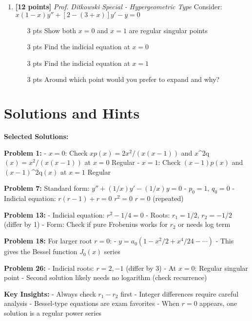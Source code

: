 \documentclass[12pt]{article}
\begin{document}
\begin{enumerate}[resume]
\item \textbf{[12 points]} \textit{Prof. Ditkowski Special - Hypergeometric Type}
Consider: $x(1-x)y'' + [2-(3+x)]y' - y = 0$
\begin{enumerate}[label=(\alph*)]
\item [3 pts] Show both $x = 0$ and $x = 1$ are regular singular points
\item [3 pts] Find the indicial equation at $x = 0$
\item [3 pts] Find the indicial equation at $x = 1$
\item [3 pts] Around which point would you prefer to expand and why?
\end{enumerate}
\end{enumerate}

\section*{Solutions and Hints}

\textbf{Selected Solutions:}

\textbf{Problem 1:}
- $x = 0$: Check $xp(x) = 2x^{2}/(x(x-1))$ and $x$^{2q}$(x) = x^{2}/(x(x-1))$ at $x = 0$ \rightarrow Regular
- $x = 1$: Check $(x-1)p(x)$ and $(x-1)$^{2q}$(x)$ at $x = 1$ \rightarrow Regular

\textbf{Problem 7:}
Standard form: $y'' + (1/x)y' - (1/x)y = 0$
- $p_{0} = 1$, $q_{0} = 0$
- Indicial equation: $r(r-1) + r = 0$ \rightarrow $r^{2} = 0$ \rightarrow $r = 0$ (repeated)

\textbf{Problem 13:}
- Indicial equation: $r^{2} - 1/4 = 0$
- Roots: $r_{1} = 1/2$, $r_{2} = -1/2$ (differ by 1)
- Form: Check if pure Frobenius works for $r_{2}$ or needs log term

\textbf{Problem 18:}
For larger root $r = 0$:
- $y = a_{0}(1 - x^{2}/2 + x^{4}/24 - \cdots)$
- This gives the Bessel function $J_{0}(x)$ series

\textbf{Problem 26:}
- Indicial roots: $r = 2, -1$ (differ by 3)
- At $x = 0$: Regular singular point
- Second solution likely needs no logarithm (check recurrence)

\textbf{Key Insights:}
- Always check $r_{1} - r_{2}$ first
- Integer differences require careful analysis
- Bessel-type equations are exam favorites
- When $r = 0$ appears, one solution is a regular power series
\end{document}
